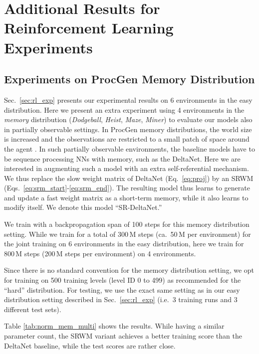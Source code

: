\documentclass[nohyperref]{article}
\theoremstyle{plain}
\theoremstyle{definition}
\theoremstyle{remark}
\begin{document}
\section{Additional Results for Reinforcement Learning Experiments}

\subsection{Experiments on ProcGen Memory Distribution}
\label{app:proc_mem}

Sec.~\ref{sec:rl_exp} presents our experimental results on 6 environments in the easy distribution.
Here we present an extra experiment using 4 environments in the \textit{memory} distribution (\textit{Dodgeball}, \textit{Heist}, \textit{Maze}, \textit{Miner}) to evaluate our models also in partially observable settings.
In ProcGen memory distributions, the world size  is increased
and the observations are restricted
to a small patch of space around the agent \citep{CobbeHHS20}.
In such partially observable environments, the baseline models have to be sequence processing NNs with memory, such as the DeltaNet.
Here we are interested in augmenting such a model with an extra self-referential mechanism.
We thus replace the slow weight matrix of DeltaNet (Eq.~\ref{eq:proj}) by an SRWM (Eqs.~\ref{eq:srm_start}-\ref{eq:srm_end}).
The resulting model thus learns to generate and update a fast weight matrix as a short-term memory, while it also learns to modify itself.
We denote this model ``SR-DeltaNet.''

We train with a backpropagation span of 100 steps for
this memory distribution setting.
While we train for a total of 300\,M steps (ca.~50\,M per environment) for the joint training on 6 environments in the easy distribution,
here we train for 800\,M steps (200\,M steps per environment) on 4 environments.

Since there is no standard convention \citep{CobbeHHS20} for the memory distribution setting, we opt for training on 500 training levels (level ID 0 to 499) as recommended for the ``hard'' distribution.
For testing, we use the exact same setting as in our easy distribution setting described in Sec.~\ref{sec:rl_exp} (i.e.~3 training runs and 3 different test sets).

Table \ref{tab:norm_mem_multi} shows the results.
While having a similar parameter count, the SRWM variant
achieves a better training score than the DeltaNet baseline, while the test scores are rather close.
\end{document}
